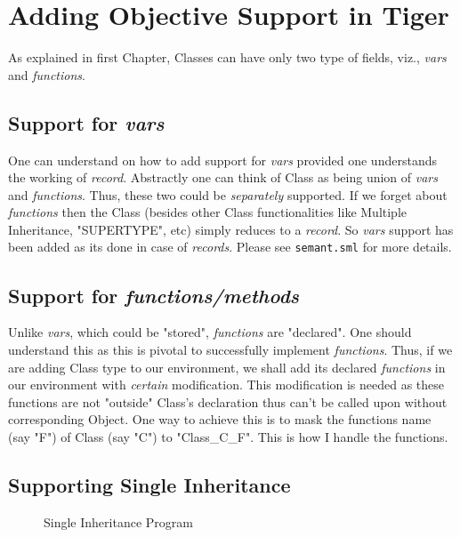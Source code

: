 \chapter{Adding Objective Support in Tiger}
\hspace{3mm}

As explained in first Chapter, Classes can have only two type of fields, viz., \textit{vars} and \textit{functions}.

\section{Support for \textit{vars}}

One can understand on how to add support for \textit{vars} provided one understands the working of \textit{record}. Abstractly one can think of Class as being union of \textit{vars} and \textit{functions}. Thus, these two could be \textit{separately} supported. If we forget about \textit{functions} then the Class (besides other Class functionalities like Multiple Inheritance, "SUPERTYPE", etc) simply reduces to a \textit{record}. So \textit{vars} support has been added as its done in case of \textit{records}. Please see \texttt{semant.sml} for more details.

\section{Support for \textit{functions/methods}}

Unlike \textit{vars}, which could be "stored", \textit{functions} are "declared". One should understand this as this is pivotal to successfully implement \textit{functions}. Thus, if we are adding Class type to our environment, we shall add its declared \textit{functions} in our environment with \textit{certain} modification. This modification is needed as these functions are not "outside" Class's declaration thus can't be called upon without corresponding Object. One way to achieve this is to mask the functions name (say "F") of Class (say "C") to "Class\_C\_F". This is how I handle the functions.

\section{Supporting Single Inheritance}

\begin{figure}
\centering
{}
\caption{Single Inheritance Program}
\label{fig:SI1}
\end{figure}

